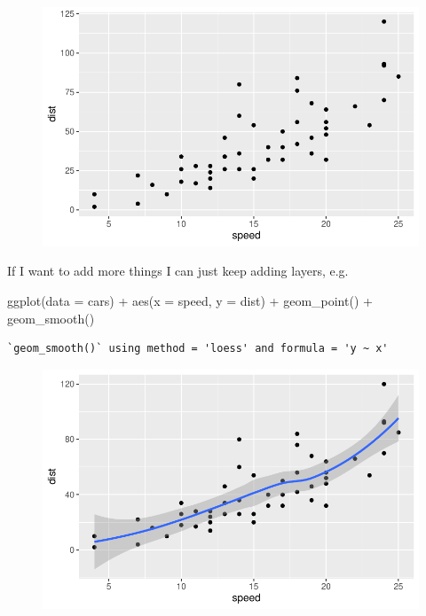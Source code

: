 \documentclass[
  letterpaper,
  DIV=11,
  numbers=noendperiod]{scrartcl}
\newenvironment{Shaded}{\begin{snugshade}}{\end{snugshade}}
\newcommand{\AttributeTok}[1]{\textcolor[rgb]{0.40,0.45,0.13}{#1}}
\newcommand{\FunctionTok}[1]{\textcolor[rgb]{0.28,0.35,0.67}{#1}}
\newcommand{\NormalTok}[1]{\textcolor[rgb]{0.00,0.23,0.31}{#1}}
\newcommand{\SpecialCharTok}[1]{\textcolor[rgb]{0.37,0.37,0.37}{#1}}
\begin{document}
\begin{figure}[H]

{\centering \includegraphics{class05_files/figure-pdf/unnamed-chunk-4-1.pdf}

}

\end{figure}

If I want to add more things I can just keep adding layers, e.g.

\begin{Shaded}
\begin{Highlighting}[]
\FunctionTok{ggplot}\NormalTok{(}\AttributeTok{data =}\NormalTok{ cars) }\SpecialCharTok{+}
  \FunctionTok{aes}\NormalTok{(}\AttributeTok{x =}\NormalTok{ speed, }\AttributeTok{y =}\NormalTok{ dist) }\SpecialCharTok{+}
  \FunctionTok{geom\_point}\NormalTok{() }\SpecialCharTok{+} 
  \FunctionTok{geom\_smooth}\NormalTok{()}
\end{Highlighting}
\end{Shaded}

\begin{verbatim}
`geom_smooth()` using method = 'loess' and formula = 'y ~ x'
\end{verbatim}

\begin{figure}[H]

{\centering \includegraphics{class05_files/figure-pdf/unnamed-chunk-5-1.pdf}

}

\end{figure}
\end{document}
